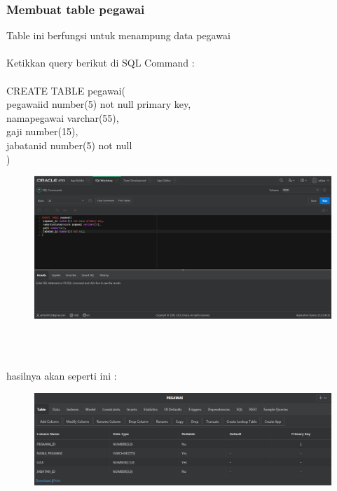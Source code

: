 \documentclass[12pt, times new roman, a4paper]{report}
\begin{document}
\subsubsection{Membuat table pegawai}
\hspace{1cm} Table ini berfungsi untuk menampung data pegawai\\
\\
Ketikkan query berikut di SQL Command :\\
\\
CREATE TABLE pegawai(\\
 pegawai\textunderscore id number(5) not null primary key,\\
 nama\textunderscore pegawai varchar(55),\\
 gaji number(15),\\
 jabatan\textunderscore id number(5) not null\\
)\\
\begin{figure}[h]
	\centering
		\includegraphics[scale=0.3]{gambar/5}
\end{figure}
\\
\\
\par hasilnya akan seperti ini :
\begin{figure}[h]
	\centering
		\includegraphics[scale=0.5]{gambar/4}
\end{figure}
\end{document}
